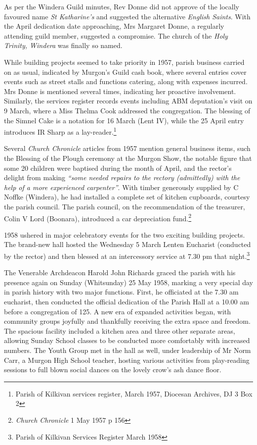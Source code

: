 As per the Windera Guild minutes, Rev Donne did not approve of the locally favoured name \emph{St Katharine's} and suggested the alternative \emph{English Saints}. With the April dedication date approaching, Mrs Margaret Donne, a regularly attending guild member, suggested a compromise. The church of the \emph{Holy Trinity, Windera} was finally so named.



While building projects seemed to take priority in 1957, parish business carried on as usual, indicated by Murgon's Guild cash book, where several entries cover events such as street stalls and functions catering, along with expenses incurred. Mrs Donne is mentioned several times, indicating her proactive involvement. Similarly, the services register records events including ABM deputation's visit on 9 March, where a Miss Thelma Cook addressed the congregation. The blessing of the Simnel Cake is a notation for 16 March (Lent IV), while the 25 April entry introduces IR Sharp as a lay-reader.\footnote{Parish of Kilkivan services register, March 1957, Diocesan Archives, DJ 3 Box 2}


Several \emph{Church Chronicle} articles from 1957 mention general business items, such the Blessing of the Plough ceremony at the Murgon Show, the notable figure that some 20 children were baptised during the month of April, and the rector's delight from making \emph{``some needed repairs to the rectory (admittedly) with the help of a more experienced carpenter''}. With timber generously supplied by C Noffke (Windera), he had installed a complete set of kitchen cupboards, courtesy the parish council. The parish council, on the recommendation of the treasurer, Colin V Lord (Boonara), introduced a car depreciation fund.\footnote{\emph{Church Chronicle} 1 May 1957 p 156}


1958 ushered in major celebratory events for the two exciting building projects. The brand-new hall hosted the Wednesday 5 March Lenten Eucharist (conducted by the rector) and then blessed at an intercessory service at 7.30 pm that night.\footnote{Parish of Kilkivan Services Register March 1958}


The Venerable Archdeacon Harold John Richards graced the parish with his presence again on Sunday (Whitsunday) 25 May 1958, marking a very special day in parish history with two major functions. First, he officiated at the 7.30 am eucharist, then conducted the official dedication of the Parish Hall at a 10.00 am before a congregation of 125. A new era of expanded activities began, with community groups joyfully and thankfully receiving the extra space and freedom. The spacious facility included a kitchen area and three other separate areas, allowing Sunday School classes to be conducted more comfortably with increased numbers. The Youth Group met in the hall as well, under leadership of Mr Norm Carr, a Murgon High School teacher, hosting various activities from play-reading sessions to full blown social dances on the lovely crow's ash dance floor.



